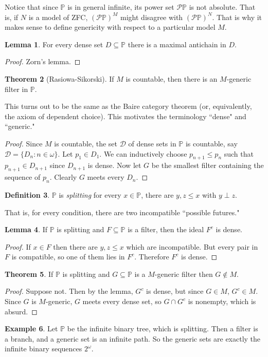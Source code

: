 \documentclass[12pt]{report}
\newcommand{\PP}{\mathbb{P}}
\newcommand{\pset}{\mathcal{P}}
\newcommand{\dfn}[1]{\emph{#1}\index{#1}}
\theoremstyle{definition}
\newtheorem{theorem}{Theorem}[chapter]
\newtheorem{lemma}[theorem]{Lemma}
\newtheorem{definition}[theorem]{Definition}
\newtheorem{example}[theorem]{Example}
\begin{document}
    Notice that since $\PP$ is in general infinite, its power set $\pset \PP$ is not absolute. That is, if $N$ is a model of ZFC, $(\pset \PP)^M$ might disagree with $(\pset \PP)^N$. That is why it makes sense to define genericity with respect to a particular model $M$.
\begin{lemma}
    For every dense set $D \subseteq \PP$ there is a maximal antichain in $D$.
\end{lemma}
\begin{proof}
    Zorn's lemma.
\end{proof}

\begin{theorem}[Rasiowa-Sikorski]
    If $M$ is countable, then there is an $M$-generic filter in $\PP$.
\end{theorem}
This turns out to be the same as the Baire category theorem (or, equivalently, the axiom of dependent choice). This motivates the terminology ``dense" and ``generic."
\begin{proof}
    Since $M$ is countable, the set $\mathcal D$ of dense sets in $\PP$ is countable, say $\mathcal D = \{D_n: n \in \omega\}$. Let $p_1 \in D_1$. We can inductively choose $p_{n+1} \leq p_n$ such that $p_{n+1} \in D_{n+1}$ since $D_{n+1}$ is dense. Now let $G$ be the smallest filter containing the sequence of $p_n$. Clearly $G$ meets every $D_n$.
\end{proof}

\begin{definition}
    $\PP$ is \dfn{splitting} for every $x \in \PP$, there are $y, z \leq x$ with $y \perp z$.
\end{definition}
    That is, for every condition, there are two incompatible ``possible futures."

\begin{lemma}
    If $\PP$ is splitting and $F \subseteq \PP$ is a filter, then the ideal $F^c$ is dense.
\end{lemma}
\begin{proof}
    If $x \in F$ then there are $y, z \leq x$ which are incompatible. But every pair in $F$ is compatible, so one of them lies in $F^c$. Therefore $F^c$ is dense.
\end{proof}
\begin{theorem}
    If $\PP$ is splitting and $G \subseteq \PP$ is a $M$-generic filter then $G \notin M$.
\end{theorem}
\begin{proof}
    Suppose not. Then by the lemma, $G^c$ is dense, but since $G \in M$, $G^c \in M$. Since $G$ is $M$-generic, $G$ meets every dense set, so $G \cap G^c$ is nonempty, which is absurd.
\end{proof}
\begin{example}
    Let $\PP$ be the infinite binary tree, which is splitting. Then a filter is a branch, and a generic set is an infinite path. So the generic sets are exactly the infinite binary sequences $2^\omega$.
\end{example}
\end{document}
